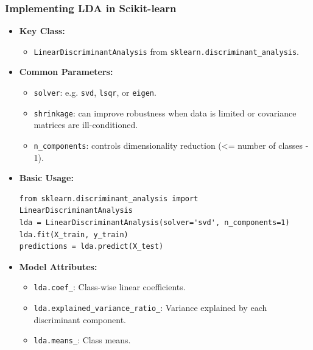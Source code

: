 \documentclass[aspectratio=169]{beamer}
\begin{document}
\begin{frame}[fragile]
    \frametitle{Implementing LDA in Scikit-learn}
    \begin{itemize}
        \item \textbf{Key Class:} 
        \begin{itemize}
            \item \texttt{LinearDiscriminantAnalysis} from \texttt{sklearn.discriminant\_analysis}.
        \end{itemize}
        \item \textbf{Common Parameters:}
        \begin{itemize}
            \item \texttt{solver}: e.g. \texttt{svd}, \texttt{lsqr}, or \texttt{eigen}.
            \item \texttt{shrinkage}: can improve robustness when data is limited or covariance matrices are ill-conditioned.
            \item \texttt{n\_components}: controls dimensionality reduction (<= number of classes - 1).
        \end{itemize}
        \item \textbf{Basic Usage:}
\begin{verbatim}
from sklearn.discriminant_analysis import LinearDiscriminantAnalysis
lda = LinearDiscriminantAnalysis(solver='svd', n_components=1)
lda.fit(X_train, y_train)
predictions = lda.predict(X_test)
\end{verbatim}
        \item \textbf{Model Attributes:}
        \begin{itemize}
            \item \texttt{lda.coef\_}: Class-wise linear coefficients.
            \item \texttt{lda.explained\_variance\_ratio\_}: Variance explained by each discriminant component.
            \item \texttt{lda.means\_}: Class means.
        \end{itemize}
    \end{itemize}
\end{frame}
\end{document}

